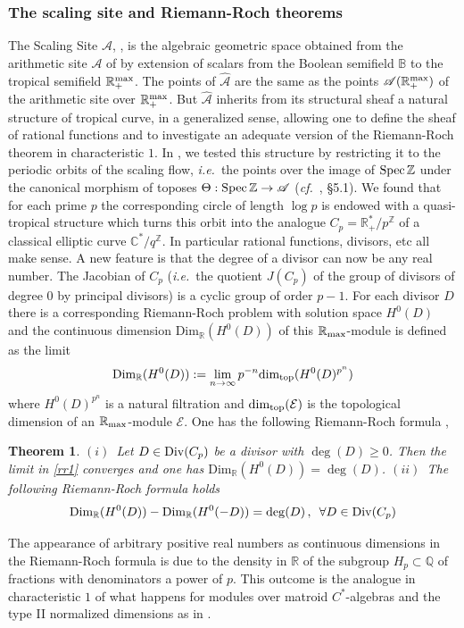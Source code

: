 \documentclass[12pt]{article}
\newtheorem{thm}{Theorem}[section]
\def\qqq{\,,\quad~\forall}
\def\Spec{{\rm Spec\,}}
\def\B{{\mathbb B}}
\def\C{{\mathbb C}}
\def\N{{\mathbb N}}
\def\Q{{\mathbb Q}}
\def\R{{\mathbb R}}
\def\Z{{\mathbb Z}}
\def\aarith{{\mathscr A}}
\def\scal{{(\rnt,\cO)}}
\def\scal1{{\hat \aarith}}
\def\cdim{{{\mbox{Dim}_\R}}}
\def\tdim{{{\mbox{dim}_{\rm top}}}}
\def\cE{{\mathcal E}}
\def\cO{{\mathcal O}}
\def\qqq{\,,\,~\forall}
\newcommand{\ie}{{\it i.e.\/}\ }
\newcommand{\cf}{{\it cf.}}
\def\spz{{\Spec\Z}}
\def\rma{\R_{\rm max}}
\def\rmax{\R_+^{\rm max}}
\def\vsp{\vspace{.05in}}
\def\rnt{{[0,\infty)\rtimes{\N^{\times}}}}
\def\div{{\rm Div}}
\begin{document}
\subsubsection{The scaling site and Riemann-Roch theorems}
The Scaling Site $\scal1$, \cite{CCss},  is the algebraic geometric space  obtained from the arithmetic site $\aarith$ of \cite{CC,CCas1} by extension of scalars from the Boolean semifield $\B$ to the tropical semifield $\rmax$. The points of $\scal1$ are the same as the points $\aarith(\rmax)$ of the arithmetic site over $\rmax$. But $\scal1$ inherits from its structural sheaf a natural structure of tropical curve, in a generalized sense,  allowing one to define the sheaf of rational functions and to investigate an adequate version of the Riemann-Roch theorem in characteristic $1$. In \cite{CCss}, we tested this structure by restricting it to the periodic orbits of the scaling flow, \ie the points over the image of $\Spec\Z$ under the canonical morphism of toposes $\Theta:\spz\to \aarith$ (\cf~\cite{CCas1}, \S 5.1). We found that for each prime $p$ the corresponding circle of length $\log p$ is endowed with a quasi-tropical structure which turns this orbit into the analogue $C_p=\R_+^*/p^\Z$ of a classical elliptic curve $\C^*/q^\Z$. In particular  rational functions, divisors, etc all make sense. A new feature is that the degree of a divisor can now be any real number. The Jacobian of $C_p$ (\ie the quotient $J(C_p)$  of the group of divisors of degree $0$ by principal divisors)  is a cyclic group of order $p-1$. For each divisor $D$ there is a corresponding Riemann-Roch problem with solution space $H^0(D)$ and  the continuous dimension $\cdim(H^0(D))$ of this $\rma$-module is defined as the limit
\begin{equation}\label{rr1}
\cdim(H^0(D)):=\lim_{n\to \infty} p^{-n}\tdim(H^0(D)^{p^n})
\end{equation}
where $H^0(D)^{p^n}$ is a natural filtration and $\tdim(\cE)$ is  the topological dimension of an $\rma$-module $\cE$.  One has the following Riemann-Roch formula \cite{CCss},
\vsp
\begin{thm}\label{RRperiodic}
$(i)$~Let $D\in \div(C_p)$ be a divisor with $\deg(D)\geq 0$. Then the limit in \eqref{rr1} converges and one has  
$\cdim(H^0(D))=\deg(D)$.\newline
$(ii)$~The following Riemann-Roch formula holds
\begin{equation*}%
\cdim(H^0(D))-\cdim(H^0(-D))=\deg(D)\qqq  D\in \div(C_p)
\end{equation*}
\end{thm}
The appearance of arbitrary positive real numbers as continuous dimensions in the  Riemann-Roch formula is due to the density in $\R$ of the subgroup $H_p\subset \Q$ of fractions with denominators a power of $p$.
 This outcome  is the analogue in characteristic $1$ of what happens for modules over matroid  $C^*$-algebras and the type II normalized dimensions  as in \cite{dix}. 
\end{document}
